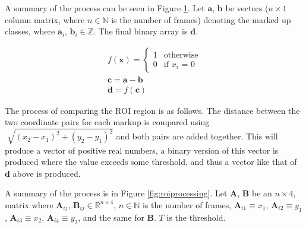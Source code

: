     A summary of the process can be seen in Figure \ref{fig:classprocessing}. Let $\pmb{a}$, $\pmb{b}$ be vectors ($n \times 1$ column matrix, where $n \in \mathbb{N}$ is the number of frames) denoting the marked up classes, where $\pmb{a}_i$, $\pmb{b}_i \in \mathbb{Z}$. The final binary array is $\pmb{d}$.
    \begin{figure}[h]
        \centering
        \begin{gather*}
            f(\pmb{x})=
        \begin{cases}%
        1      & \text{otherwise}\\
        0      & \text{if $x_i$ = 0}
        \end{cases} \\
        \pmb{c}=\pmb{a}-\pmb{b} \\
        \pmb{d}=f(\pmb{c})
        \end{gather*}
        \caption{}
        \label{fig:classprocessing}
    \end{figure}

    The process of comparing the ROI region is as follows. The distance between the two coordinate pairs for each markup is compared using $\sqrt[]{{(x_2-x_1)}^2+{(y_2-y_1)}^2}$ and both pairs are added together. This will produce a vector of positive real numbers, a binary version of this vector is produced where the value exceeds some threshold, and thus a vector like that of $\pmb{d}$ above is produced.

    A summary of the process is in Figure \ref{fig:roiprocessing}. Let $\pmb{A}$, $\pmb{B}$ be an $n \times 4$, matrix where $\pmb{A}_{ij}$, $\pmb{B}_{ij} \in \mathbb{R}^{n \times 4}$, $n \in \mathbb{N}$ is the number of frames, ${\pmb{A}}_{i1} \equiv x_1$, ${\pmb{A}}_{i2} \equiv y_1$, ${\pmb{A}}_{i3} \equiv x_2$, ${\pmb{A}}_{i4} \equiv y_2$, and the same for $\pmb{B}$. $T$ is the threshold.

